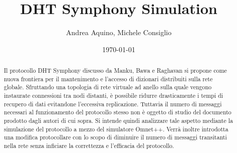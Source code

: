 \documentclass[	
	DIV=calc,
	paper=a4,
	fontsize=11pt,
	onecolumn
]{scrartcl} %
\title{DHT Symphony Simulation}					%
\author{Andrea Aquino, Michele Consiglio}											%
\date{\today}																				%
\begin{document}
	\maketitle
	\thispagestyle{fancy} %
	\begin{abstract}
	Il protocollo DHT Symphony discusso da Manku, Bawa e Raghavan si propone come nuova frontiera per il mantenimento e l'accesso di dizionari distribuiti sulla rete globale. Sfruttando una topologia di rete virtuale ad anello sulla quale vengono instaurate connessioni tra nodi distanti, è possibile ridurre drasticamente i tempi di recupero di dati evitandone l'eccessiva replicazione. Tuttavia il numero di messaggi necessari al funzionamento del protocollo stesso non è oggetto di studio del documento prodotto dagli autori di cui sopra. Si intende quindi analizzare tale aspetto mediante la simulazione del protocollo a mezzo del simulatore Omnet++. Verrà inoltre introdotta una modifica protocollare con lo scopo di diminuire il numero di messaggi transitanti nella rete senza inficiare la correttezza e l'efficacia del protocollo.
	\end{abstract}
	
\end{document}
